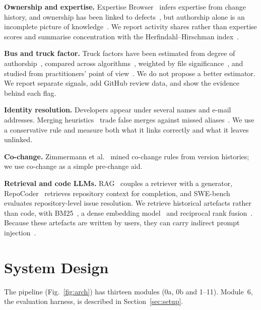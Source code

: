 \documentclass[conference]{IEEEtran}
\begin{document}
\textbf{Ownership and expertise.} Expertise Browser~\cite{mockus2002expertise} infers expertise from change history, and ownership has been linked to defects~\cite{bird2011ownership,rahman2011ownership}, but authorship alone is an incomplete picture of knowledge~\cite{fritz2010dok}. We report activity shares rather than expertise scores and summarise concentration with the Herfindahl--Hirschman index~\cite{hirschman1964paternity}.

\textbf{Bus and truck factor.} Truck factors have been estimated from degree of authorship~\cite{avelino2016truck}, compared across algorithms~\cite{ferreira2017truck}, weighted by file significance~\cite{haratian2023bfsig}, and studied from practitioners' point of view~\cite{jabrayilzade2022busfactor}. We do not propose a better estimator. We report separate signals, add GitHub review data, and show the evidence behind each flag.

\textbf{Identity resolution.} Developers appear under several names and e-mail addresses. Merging heuristics~\cite{bird2006email,robles2005identities} trade false merges against missed aliases~\cite{goeminne2013identity}. We use a conservative rule and measure both what it links correctly and what it leaves unlinked.

\textbf{Co-change.} Zimmermann et al.~\cite{zimmermann2005mining} mined co-change rules from version histories; we use co-change as a simple pre-change aid.

\textbf{Retrieval and code LLMs.} RAG~\cite{lewis2020rag} couples a retriever with a generator, RepoCoder~\cite{zhang2023repocoder} retrieves repository context for completion, and SWE-bench~\cite{jimenez2024swebench} evaluates repository-level issue resolution. We retrieve historical artefacts rather than code, with BM25~\cite{robertson2009bm25}, a dense embedding model~\cite{xiao2023cpack} and reciprocal rank fusion~\cite{cormack2009rrf}. Because these artefacts are written by users, they can carry indirect prompt injection~\cite{greshake2023injection}.

\section{System Design}
The pipeline (Fig.~\ref{fig:arch}) has thirteen modules (0a, 0b and 1--11). Module~6, the evaluation harness, is described in Section~\ref{sec:setup}.
\end{document}
